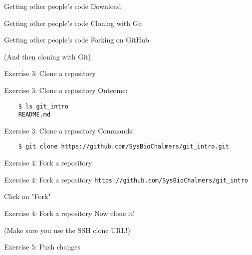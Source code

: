 \documentclass{beamer}
\begin{document}
\begin{frame}{Getting other people's code}
  \center
  \Huge Download
\end{frame}

\begin{frame}{Getting other people's code}
  \center
  \Huge Cloning with Git
\end{frame}

\begin{frame}{Getting other people's code}
  \center
  \Huge Forking on GitHub

  \Large (And then cloning with Git)
\end{frame}

\begin{frame}{}
  \center
  \Huge Exercise 3: Clone a repository
\end{frame}

\begin{frame}[fragile]{Exercise 3: Clone a repository}
  Outcome:

  \begin{verbatim}
    $ ls git_intro
    README.md
  \end{verbatim}
\end{frame}

\begin{frame}[fragile]{Exercise 3: Clone a repository}
  Commands:

  \begin{verbatim}
    $ git clone https://github.com/SysBioChalmers/git_intro.git
  \end{verbatim}
\end{frame}

\begin{frame}{}
  \center
  \Huge Exercise 4: Fork a repository
\end{frame}

\begin{frame}{Exercise 4: Fork a repository}
  \center
  \large \texttt{https://github.com/SysBioChalmers/git_intro}
  \pause

  \Large Click on "Fork"
\end{frame}

\begin{frame}{Exercise 4: Fork a repository}
  \center
  \Huge Now clone it!
  \pause

  \LARGE (Make sure you use the SSH clone URL!)
\end{frame}

\begin{frame}{}
  \center
  \Huge Exercise 5: Push changes
\end{frame}
\end{document}
